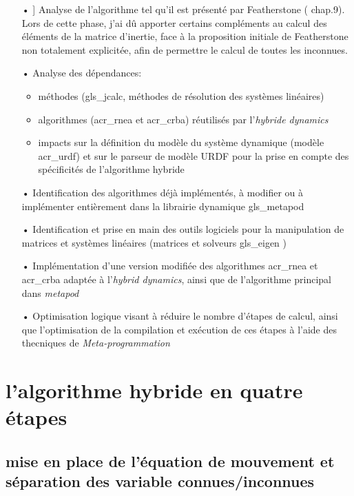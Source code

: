 \documentclass{report}
\begin{document}
\begin{itemize}
  \item[•]] Analyse de l'algorithme tel qu'il est présenté par Featherstone (\cite{bib_featherstone} chap.9). Lors de cette phase, j'ai dû apporter certains compléments au calcul des éléments de la matrice d'inertie, face à la proposition initiale de Featherstone non totalement explicitée, afin de permettre le calcul de toutes les inconnues.
  \item[•] Analyse des dépendances:
  \begin{itemize}
    \item méthodes (\gls{gls_jcalc}, méthodes de résolution des systèmes linéaires)
    \item algorithmes (\gls{acr_rnea} et \gls{acr_crba}) réutilisés par l'\emph{hybride dynamics}
    \item impacts sur la définition du modèle du système dynamique (modèle \gls{acr_urdf}) et sur le parseur de modèle URDF pour la prise en compte des spécificités de l'algorithme hybride
  \end{itemize}
  \item[•] Identification des algorithmes déjà implémentés, à modifier ou à implémenter entièrement dans la librairie dynamique \gls{gls_metapod}
  \item[•] Identification et prise en main des outils logiciels pour la manipulation de matrices et systèmes linéaires (matrices et solveurs \gls{gls_eigen} \cite{bib_eigen})
  \item[•] Implémentation d'une version modifiée des algorithmes \gls{acr_rnea} et \gls{acr_crba} adaptée à l'\emph{hybrid dynamics}, ainsi que de l'algorithme principal dans \emph{metapod}
  \item[•] Optimisation logique visant à réduire le nombre d'étapes de calcul, ainsi que l'optimisation de la compilation et exécution de ces étapes à l'aide des thecniques de \emph{Meta-programmation}
\end{itemize}


\section{l'algorithme hybride en quatre étapes}

\subsection{mise en place de l'équation de mouvement et séparation des variable connues/inconnues}
\end{document}
